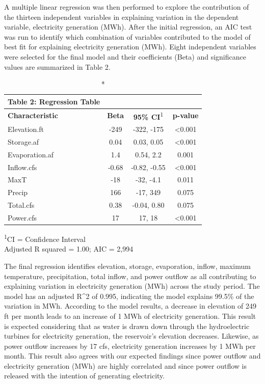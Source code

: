 \documentclass[
  12pt,
]{article}
\begin{document}
A multiple linear regression was then performed to explore the
contribution of the thirteen independent variables in explaining
variation in the dependent variable, electricity generation (MWh). After
the initial regression, an AIC test was run to identify which
combination of variables contributed to the model of best fit for
explaining electricity generation (MWh). Eight independent variables
were selected for the final model and their coefficients (Beta) and
significance values are summarized in Table 2.

\captionsetup[table]{labelformat=empty,skip=1pt}
\setlength{\LTpost}{0mm}
\begin{longtable}{lccc}
\caption*{
{\large Table 2: Regression Table}
} \\ 
\toprule
\textbf{Characteristic} & \textbf{Beta} & \textbf{95\% CI}\textsuperscript{1} & \textbf{p-value} \\ 
\midrule
Elevation.ft & -249 & -322, -175 & <0.001 \\ 
Storage.af & 0.04 & 0.03, 0.05 & <0.001 \\ 
Evaporation.af & 1.4 & 0.54, 2.2 & 0.001 \\ 
Inflow.cfs & -0.68 & -0.82, -0.55 & <0.001 \\ 
MaxT & -18 & -32, -4.1 & 0.011 \\ 
Precip & 166 & -17, 349 & 0.075 \\ 
Total.cfs & 0.38 & -0.04, 0.80 & 0.075 \\ 
Power.cfs & 17 & 17, 18 & <0.001 \\ 
\bottomrule
\end{longtable}
\begin{minipage}{\linewidth}
\textsuperscript{1}CI = Confidence Interval\\
Adjusted R squared = 1.00; AIC = 2,994\\
\end{minipage}

The final regression identifies elevation, storage, evaporation, inflow,
maximum temperature, precipitation, total inflow, and power outflow as
all contributing to explaining variation in electricity generation (MWh)
across the study period. The model has an adjusted R\^{}2 of 0.995,
indicating the model explains 99.5\% of the variation in MWh. According
to the model results, a decrease in elevation of 249 ft per month leads
to an increase of 1 MWh of electricity generation. This result is
expected considering that as water is drawn down through the
hydroelectric turbines for electricity generation, the reservoir's
elevation decreases. Likewise, as power outflow increases by 17 cfs,
electricity generation increases by 1 MWh per month. This result also
agrees with our expected findings since power outflow and electricity
generation (MWh) are highly correlated and since power outflow is
released with the intention of generating electricity.
\end{document}
